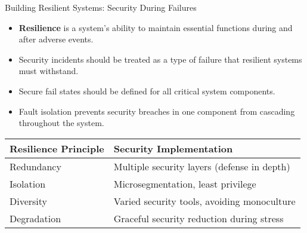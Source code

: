 \documentclass{beamer}
\begin{document}
            \begin{frame}{Building Resilient Systems: Security During Failures}
            \begin{itemize}
            \item \textbf{Resilience} is a system's ability to maintain essential functions during and after adverse events.
            \item Security incidents should be treated as a type of failure that resilient systems must withstand.
            \item Secure fail states should be defined for all critical system components.
            \item Fault isolation prevents security breaches in one component from cascading throughout the system.
            \end{itemize}
            
            \begin{table}
            \begin{tabular}{ll}
            \toprule
            \textbf{Resilience Principle} & \textbf{Security Implementation} \\
            \midrule
            Redundancy & Multiple security layers (defense in depth) \\
            Isolation & Microsegmentation, least privilege \\
            Diversity & Varied security tools, avoiding monoculture \\
            Degradation & Graceful security reduction during stress \\
            \bottomrule
            \end{tabular}
            \end{table}
            \end{frame}
\end{document}
